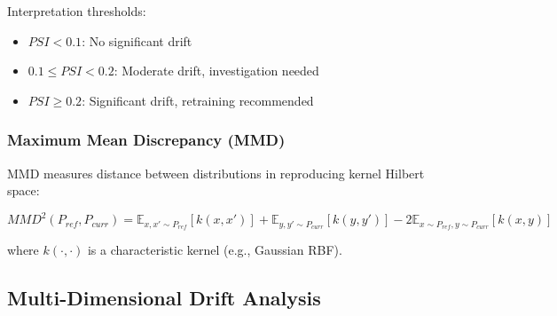 Interpretation thresholds:
\begin{itemize}
    \item $PSI < 0.1$: No significant drift
    \item $0.1 \leq PSI < 0.2$: Moderate drift, investigation needed
    \item $PSI \geq 0.2$: Significant drift, retraining recommended
\end{itemize}

\subsubsection{Maximum Mean Discrepancy (MMD)}

MMD measures distance between distributions in reproducing kernel Hilbert space:

\begin{equation}
MMD^2(P_{ref}, P_{curr}) = \mathbb{E}_{x,x' \sim P_{ref}}[k(x,x')] + \mathbb{E}_{y,y' \sim P_{curr}}[k(y,y')] - 2\mathbb{E}_{x \sim P_{ref}, y \sim P_{curr}}[k(x,y)]
\end{equation}

where $k(\cdot, \cdot)$ is a characteristic kernel (e.g., Gaussian RBF).

\subsection{Multi-Dimensional Drift Analysis}

